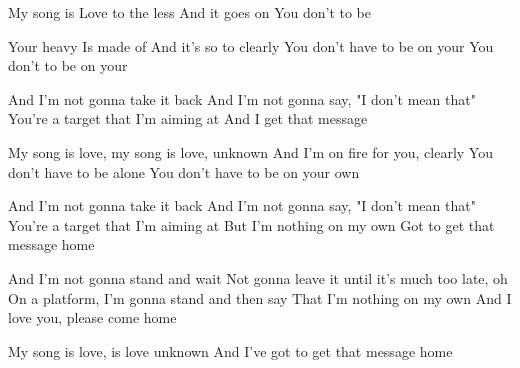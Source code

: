 \resetVars%
%
%
%
%
\MakeHeader%
\Lyrics%
My song is  
Love to the less 
And it goes on 
You don't  to be 

Your heavy  
Is made of  
And it's so  to  clearly
You don't have to be on your 
You don't  to be on your 

And I'm not gonna take it back
And I'm not gonna say, "I don't mean that"
You're a target that I'm aiming at
And I get that message 

My song is love, my song is love, unknown
And I'm on fire for you, clearly
You don't have to be alone
You don't have to be on your own

And I'm not gonna take it back
And I'm not gonna say, "I don't mean that"
You're a target that I'm aiming at
But I'm nothing on my own
Got to get that message home

And I'm not gonna stand and wait
Not gonna leave it until it's much too late, oh
On a platform, I'm gonna stand and then say
That I'm nothing on my own
And I love you, please come home

My song is love, is love unknown
And I've got to get that message home

\Next
